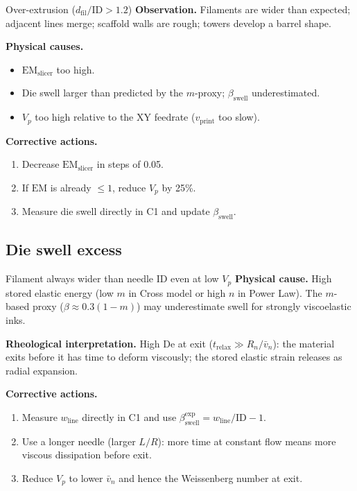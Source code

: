\documentclass[11pt,a4paper]{article}
\newcommand{\De}{\mathrm{De}}
\begin{document}
\begin{failurebox}{Over-extrusion ($d_\mathrm{fil}/\mathrm{ID}>1.2$)}
\textbf{Observation.} Filaments are wider than expected; adjacent lines
merge; scaffold walls are rough; towers develop a barrel shape.

\textbf{Physical causes.}
\begin{itemize}[leftmargin=1.4em,itemsep=2pt]
\item $\mathrm{EM}_\mathrm{slicer}$ too high.
\item Die swell larger than predicted by the $m$-proxy; $\beta_\mathrm{swell}$
  underestimated.
\item $V_p$ too high relative to the XY feedrate ($v_\mathrm{print}$ too slow).
\end{itemize}

\textbf{Corrective actions.}
\begin{enumerate}[leftmargin=1.6em,itemsep=1pt]
\item Decrease $\mathrm{EM}_\mathrm{slicer}$ in steps of 0.05.
\item If $\mathrm{EM}$ is already $\leq 1$, reduce $V_p$ by 25\%.
\item Measure die swell directly in C1 and update $\beta_\mathrm{swell}$.
\end{enumerate}
\end{failurebox}

\subsection{Die swell excess}

\begin{failurebox}{Filament always wider than needle ID even at low $V_p$}
\textbf{Physical cause.} High stored elastic energy (low $m$ in Cross
model or high $n$ in Power Law). The $m$-based proxy
($\beta\approx 0.3(1-m)$) may underestimate swell for strongly
viscoelastic inks.

\textbf{Rheological interpretation.} High $\De$ at exit ($t_\mathrm{relax}
\gg R_n/\bar v_n$): the material exits before it has time to deform
viscously; the stored elastic strain releases as radial expansion.

\textbf{Corrective actions.}
\begin{enumerate}[leftmargin=1.6em,itemsep=1pt]
\item Measure $w_\mathrm{line}$ directly in C1 and use
  $\beta_\mathrm{swell}^\mathrm{exp}=w_\mathrm{line}/\mathrm{ID}-1$.
\item Use a longer needle (larger $L/R$): more time at constant flow
  means more viscous dissipation before exit.
\item Reduce $V_p$ to lower $\bar v_n$ and hence the Weissenberg number
  at exit.
\end{enumerate}
\end{failurebox}
\end{document}

